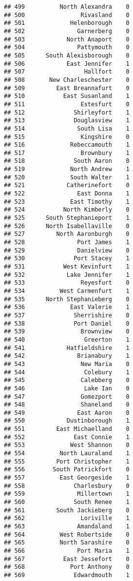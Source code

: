 \documentclass[
]{article}
\begin{document}
\begin{verbatim}
## 499          North Alexandra    0
## 500                Rivasland    0
## 501             Helenborough    0
## 502               Garnerberg    0
## 503            North Anaport    0
## 504               Pattymouth    0
## 505      South Alexisborough    0
## 506            East Jennifer    1
## 507                 Hallfort    0
## 508       New Charleschester    0
## 509         East Breannafurt    0
## 510           East Susanland    1
## 511                Estesfurt    0
## 512              Shirleyfort    1
## 513              Douglasview    1
## 514               South Lisa    1
## 515                Kingshire    0
## 516             Rebeccamouth    1
## 517                Brownbury    1
## 518              South Aaron    0
## 519             North Andrew    1
## 520             South Walter    1
## 521            Catherinefort    0
## 522               East Donna    1
## 523             East Timothy    1
## 524           North Kimberly    0
## 525      South Stephanieport    1
## 526      North Isabellaville    0
## 527         North Aaronburgh    0
## 528               Port James    1
## 529               Danielview    0
## 530              Port Stacey    1
## 531           West Kevinfurt    1
## 532            Lake Jennifer    1
## 533                Reyesfurt    0
## 534          West Carmenfurt    1
## 535      North Stephanieberg    0
## 536             East Valerie    1
## 537              Sherrishire    0
## 538              Port Daniel    0
## 539                Brownview    0
## 540                 Greerton    1
## 541            Hatfieldshire    1
## 542               Brianabury    1
## 543                New Maria    0
## 544                 Colebury    1
## 545                Calebberg    0
## 546                 Lake Ian    0
## 547                Gomezport    0
## 548                Shaneland    0
## 549               East Aaron    0
## 550            Dustinborough    1
## 551         East Michaelland    0
## 552              East Connie    1
## 553             West Shannon    0
## 554          North Lauraland    1
## 555         Port Christopher    1
## 556        South Patrickfort    0
## 557          East Georgeside    1
## 558              Charlesbury    0
## 559               Millertown    1
## 560              South Renee    1
## 561         South Jackieberg    0
## 562                Loriville    1
## 563               Amandaland    1
## 564          West Robertside    0
## 565          North Sarashire    0
## 566               Port Maria    1
## 567           East Jessefort    0
## 568             Port Anthony    0
## 569              Edwardmouth    1

\end{verbatim}
\end{document}
